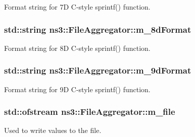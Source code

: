 Format string for 7D C-\/style sprintf() function. 

\subsubsection[{\texorpdfstring{m\+\_\+8d\+Format}{m_8dFormat}}]{\setlength{\rightskip}{0pt plus 5cm}std\+::string ns3\+::\+File\+Aggregator\+::m\+\_\+8d\+Format\hspace{0.3cm}{\ttfamily [private]}}\hypertarget{classns3_1_1FileAggregator_adb1cc33d1eff8d031a3debddba92b9a5}{}\label{classns3_1_1FileAggregator_adb1cc33d1eff8d031a3debddba92b9a5}


Format string for 8D C-\/style sprintf() function. 

\subsubsection[{\texorpdfstring{m\+\_\+9d\+Format}{m_9dFormat}}]{\setlength{\rightskip}{0pt plus 5cm}std\+::string ns3\+::\+File\+Aggregator\+::m\+\_\+9d\+Format\hspace{0.3cm}{\ttfamily [private]}}\hypertarget{classns3_1_1FileAggregator_a8726cd1f40f4da37cdd544873b4ea583}{}\label{classns3_1_1FileAggregator_a8726cd1f40f4da37cdd544873b4ea583}


Format string for 9D C-\/style sprintf() function. 

\subsubsection[{\texorpdfstring{m\+\_\+file}{m_file}}]{\setlength{\rightskip}{0pt plus 5cm}std\+::ofstream ns3\+::\+File\+Aggregator\+::m\+\_\+file\hspace{0.3cm}{\ttfamily [private]}}\hypertarget{classns3_1_1FileAggregator_a756affa0d614724be513ceedcff62ac0}{}\label{classns3_1_1FileAggregator_a756affa0d614724be513ceedcff62ac0}


Used to write values to the file. 

